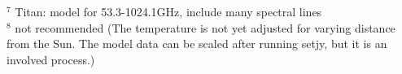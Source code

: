 \begin{table}[h!]
$^7$ Titan: model for 53.3-1024.1GHz, include many spectral lines\\
$^8$ not recommended (The temperature is not yet adjusted for
                varying distance from the Sun.  The model data can be scaled
                after running setjy, but it is an involved process.)

\normalsize

\end{table}



%
%
